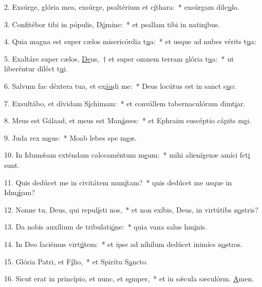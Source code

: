 2. Exsúrge, glória mea, exsúrge, psaltérium et c\uline{í}thara:~* exsúrgam dilc\uline{u}lo.\par 
3. Confitébor tibi in pópulis, D\uline{ó}mine:~* et psallam tibi in natin\uline{i}bus.\par 
4. Quia magna est super cælos misericórdia t\uline{u}a:~* et usque ad nubes vérits t\uline{u}a:\par 
5. Exaltáre super cælos, \uline{De}us,~† et super omnem terram glória t\uline{u}a:~* ut liberéntur diléct t\uline{u}i.\par 
6. Salvum fac déxtera tua, et ex\uline{áu}di me:~* Deus locútus est in sanct s\uline{u}o:\par 
7. Exsultábo, et dívidam S\uline{í}chimam:~* et convállem tabernaculórum dimt\uline{i}ar.\par 
8. Meus est Gálaad, et meus est Man\uline{á}sses:~* et Ephraim suscéptio cápits m\uline{e}i.\par 
9. Juda rex m\uline{e}us:~* Moab lebes spe m\uline{e}æ.\par 
10. In Idumǽam exténdam calceaméntum m\uline{e}um:~* mihi alienígenæ amíci fct\uline{i} sunt.\par 
11. Quis dedúcet me in civitátem mun\uline{í}tam?~* quis dedúcet me usque in Idm\uline{ǽ}am?\par 
12. Nonne tu, Deus, qui repul\uline{í}sti nos,~* et non exíbis, Deus, in virtútibs n\uline{o}stris?\par 
13. Da nobis auxílium de tribulati\uline{ó}ne:~* quia vana salus hm\uline{i}nis.\par 
14. In Deo faciémus virt\uline{ú}tem:~* et ipse ad níhilum dedúcet inimícs n\uline{o}stros.\par 
15. Glória Patri, et F\uline{í}lio,~* et Spirítu S\uline{a}ncto.\par 
16. Sicut erat in princípio, et nunc, et s\uline{e}mper,~* et in sǽcula sæculórm. \uline{A}men.\par 
